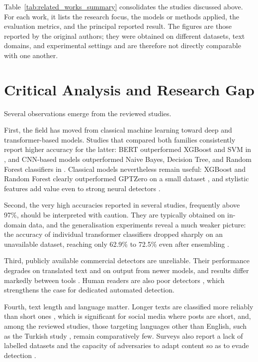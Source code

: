 Table~\ref{tab:related_works_summary} consolidates the studies discussed above. For each work, it lists the research focus, the models or methods applied, the evaluation metrics, and the principal reported result. The figures are those reported by the original authors; they were obtained on different datasets, text domains, and experimental settings and are therefore not directly comparable with one another.



\section{Critical Analysis and Research Gap}
\label{sec:lr_analysis}

Several observations emerge from the reviewed studies.

First, the field has moved from classical machine learning toward deep and transformer-based models. Studies that compared both families consistently report higher accuracy for the latter: BERT outperformed XGBoost and SVM in \cite{prova2024}, and CNN-based models outperformed Naive Bayes, Decision Tree, and Random Forest classifiers in \cite{rajkumar2024,shivakrishna2025}. Classical models nevertheless remain useful: XGBoost and Random Forest clearly outperformed GPTZero on a small dataset \cite{najjar2025}, and stylistic features add value even to strong neural detectors \cite{kumarage2023}.

Second, the very high accuracies reported in several studies, frequently above 97\%, should be interpreted with caution. They are typically obtained on in-domain data, and the generalisation experiments reveal a much weaker picture: the accuracy of individual transformer classifiers dropped sharply on an unavailable dataset, reaching only 62.9\% to 72.5\% even after ensembling \cite{lai2024}.

Third, publicly available commercial detectors are unreliable. Their performance degrades on translated text and on output from newer models, and results differ markedly between tools \cite{chaka2023,elkhatat2023,najjar2025}. Human readers are also poor detectors \cite{boutadjine2025}, which strengthens the case for dedicated automated detection.

Fourth, text length and language matter. Longer texts are classified more reliably than short ones \cite{najjar2025}, which is significant for social media where posts are short, and, among the reviewed studies, those targeting languages other than English, such as the Turkish study \cite{kayabas2025}, remain comparatively few. Surveys also report a lack of labelled datasets and the capacity of adversaries to adapt content so as to evade detection \cite{adithya2025}.

